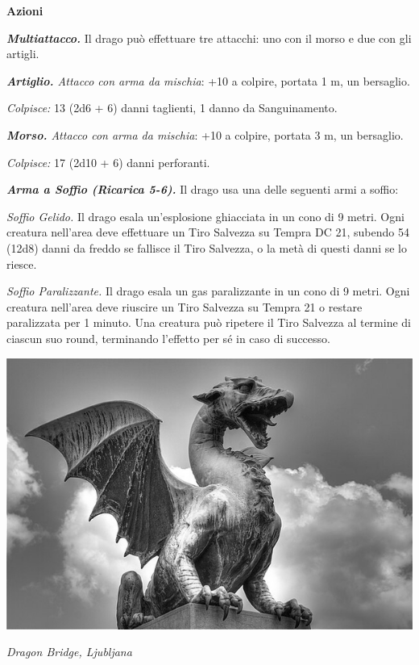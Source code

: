 \begin{multicols}{2}
{\textbf{Azioni}

\emph{\textbf{Multiattacco.}} Il drago può effettuare tre attacchi: uno con il morso e due con gli artigli.

\emph{\textbf{Artiglio.} Attacco con arma da mischia}: +10 a colpire, portata 1 m, un bersaglio.

\emph{Colpisce:} 13 (2d6 + 6) danni taglienti, 1 danno da Sanguinamento.

\emph{\textbf{Morso.} Attacco con arma da mischia}: +10 a colpire, portata 3 m, un bersaglio.

\emph{Colpisce:} 17 (2d10 + 6) danni perforanti.

\emph{\textbf{Arma a Soffio (Ricarica 5-6).}} Il drago usa una delle seguenti armi a soffio:

\emph{Soffio Gelido.} Il drago esala un'esplosione ghiacciata in un cono di 9 metri. Ogni creatura nell'area deve effettuare un Tiro Salvezza su Tempra DC 21, subendo 54 (12d8) danni da freddo se fallisce il Tiro Salvezza, o la metà di questi danni se lo riesce.

\emph{Soffio Paralizzante.} Il drago esala un gas paralizzante in un cono di 9 metri. Ogni creatura nell'area deve riuscire un Tiro Salvezza su Tempra 21 o restare paralizzata per 1 minuto. Una creatura può ripetere il Tiro Salvezza al termine di ciascun suo round, terminando l'effetto per sé in caso di successo.



\medskip

\begin{center}
	\includegraphics[width=0.9\linewidth]{immagini/Dragon_Ljubljana.png}

	\emph{Dragon Bridge, Ljubljana}
\end{center}

}
\end{multicols}
